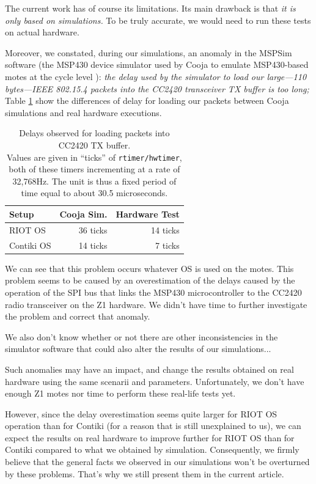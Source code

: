 \documentclass[a4paper,twoside]{article}
\begin{document}
The current work has of course its limitations. Its main drawback is that
\emph{it is only based on simulations.} To be truly accurate, we would need
to run these tests on actual hardware.

Moreover, we constated, during our simulations, an anomaly in the MSPSim
software (the MSP430 device simulator used by Cooja to emulate MSP430-based
motes at the cycle level \cite{MSPSim}): \emph{the delay used by the
simulator to load our large---110 bytes---IEEE 802.15.4 packets into
the CC2420 transceiver TX buffer is too long;} Table \ref{TblTXPktLoadDelays}
show the differences of delay for loading our packets between
Cooja simulations and real hardware executions.

\begin{table}
\centering
\begin{tabular}{|l|r|r|}
\hline
Setup     &  Cooja Sim.  & Hardware Test \\
\hline
RIOT OS    &   36 ticks  &  14 ticks \\ 
Contiki OS &   14 ticks  &   7 ticks \\
\hline
\end{tabular}
\caption{Delays observed for loading packets into CC2420 TX buffer.\\
Values are given in ``ticks'' of \texttt{rtimer/hwtimer}, both of these
timers incrementing at a rate of 32,768Hz. The unit is thus a fixed period
of time equal to about 30.5 microseconds.}
\label{TblTXPktLoadDelays}
\end{table}

We can see that this problem occurs whatever OS is used on the motes.
This problem seems to be caused by an overestimation of the delays caused
by the operation of the SPI bus that links the MSP430 microcontroller
to the CC2420 radio transceiver on the Z1 hardware. We didn't have time
to further investigate the problem and correct that anomaly.

We also don't know whether or not there are other inconsistencies in
the simulator software that could also alter the results of our
simulations...

Such anomalies may have an impact, and change the results obtained on real
hardware using the same scenarii and parameters. Unfortunately, we don't
have enough Z1 motes nor time to perform these real-life tests yet.

However, since the delay overestimation seems quite larger for RIOT OS
operation than for Contiki (for a reason that is still unexplained to us),
we can expect the results on real hardware to improve further for RIOT OS
than for Contiki compared to what we obtained by simulation. Consequently,
we firmly believe that the general facts we observed in our simulations
won't be overturned by these problems. That's why we still present
them in the current article.
\end{document}

